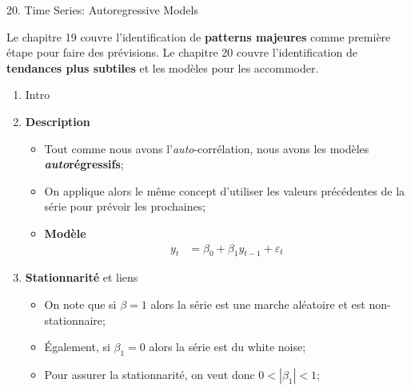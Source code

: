 \documentclass[12pt, titlepage, french]{report}
\begin{document}
\begin{CHPT_SUMM}[label = {timeseries20}]{20. Time Series: Autoregressive Models}
Le chapitre 19 couvre l'identification de \textbf{patterns majeures} comme première étape pour faire des prévisions. Le chapitre 20 couvre l'identification de \textbf{tendances plus subtiles} et les modèles pour les accommoder.

\begin{enumerate}
	\item	Intro
	\item[]	\textbf{Description}
		\begin{itemize}
		\item	Tout comme nous avons l'\textit{auto}-corrélation, nous avons les modèles \textbf{\textit{auto}régressifs};
		\item[]	On applique alors le même concept d'utiliser les valeurs précédentes de la série pour prévoir les prochaines;
		\item	\textbf{Modèle}
		\begin{align*}
			y_{t}	&=	\beta_{0} + \beta_{1} y_{t - 1} + \varepsilon_{t}
		\end{align*}
		\end{itemize}
	\item[]	\textbf{Stationnarité} et liens
		\begin{itemize}
		\item	On note que si $\beta = 1$ alors la série est une marche aléatoire et est non-stationnaire;
		\item	Également, si $\beta_1 = 0$ alors la série est du white noise;
		\item	Pour assurer la stationnarité, on veut donc $0 < |\beta_{1}| < 1$;


\end{itemize}
\end{enumerate}
\end{CHPT_SUMM}
\end{document}
